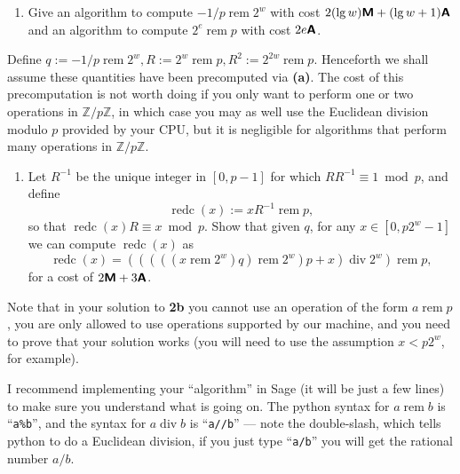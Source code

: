 \documentclass[11pt]{article}
\newcommand{\Z}{\mathbb{Z}}
\newcommand{\rem}{\operatorname{rem}}
\newcommand{\redc}{\operatorname{redc}}
\renewcommand{\div}{\operatorname{div}}
\newcommand{\M}{\textbf{\textsf M}}
\newcommand{\A}{\textbf{\textsf A}}
\begin{document}
\begin{enumerate}
\item[\textbf{(a)}] Give an algorithm to compute $-1/p\rem 2^w$ with cost $2(\lg w)\M+(\lg w+1)\A$ and an algorithm to compute $2^e\rem p$ with cost $2e\A$.
\end{enumerate}
Define $q:=-1/p\rem 2^w, R:=2^w\rem p, R^2:=2^{2w}\rem p$.  Henceforth we shall assume these quantities have been precomputed via \textbf{(a)}.   The cost of this precomputation is not worth doing if you only want to perform one or two operations in $\Z/p\Z$, in which case you may as well use the Euclidean division modulo $p$ provided by your CPU, but it is negligible for algorithms that perform  many operations in $\Z/p\Z$.
\begin{enumerate}
\item[\textbf{(b)}] Let $R^{-1}$ be the unique integer in $[0,p-1]$ for which $RR^{-1}\equiv 1\bmod p$, and define
\[
\redc(x):= xR^{-1}\rem p,
\]
so that $\redc(x)R\equiv x\bmod p$. Show that given $q$, for any $x\in [0,p2^w-1]$ we can compute $\redc(x)$ as
\[
\redc(x) = (((((x\rem 2^w)q)\rem 2^w)p + x) \div 2^w) \rem p,
\]
for a cost of $2\M+3\A$.
\end{enumerate}
Note that in your solution to \textbf{2b} you cannot use an operation of the form $a\rem p$, you are only allowed to use operations supported by our machine, and you need to prove that your solution works (you will need to use the assumption $x<p2^w$, for example).

I recommend implementing your ``algorithm'' in Sage (it will be just a few lines) to make sure you understand what is going on.  The python syntax for $a\rem b$ is ``\texttt{a\%b}'', and the syntax for $a\div b$ is ``\texttt{a//b}'' --- note the double-slash, which tells python to do a Euclidean division, if you just type ``\texttt{a/b}'' you will get the rational number $a/b$.
\bigskip
\end{document}
